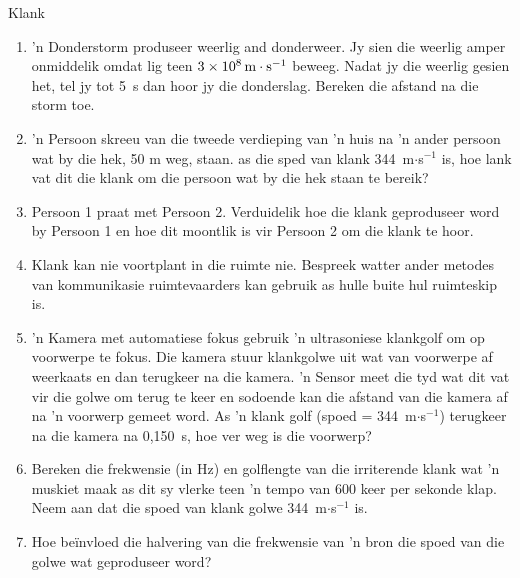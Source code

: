 \begin{eocexercises}{Klank}
\begin{enumerate}[noitemsep, label=\textbf{\arabic*}. ]
\item 'n Donderstorm produseer weerlig and donderweer. Jy sien die weerlig amper onmiddelik omdat lig teen $3\ensuremath{\times}{10}^{8}\phantom{\rule{0.166667em}{0ex}}\text{m}\ensuremath{\cdot}{\text{s}}^{-1}$ beweeg. Nadat jy die weerlig gesien het, tel jy tot 5~s dan hoor jy die donderslag. Bereken die afstand na die storm toe.

\item 'n Persoon skreeu van die tweede verdieping van 'n huis na 'n ander persoon wat by die hek, 50 m weg, staan. as die sped van klank 344~m$\ensuremath{\cdot}$s${}^{-1}$ is, hoe lank vat dit die klank om die persoon wat by die hek staan te bereik?



\item Persoon 1 praat met Persoon 2. Verduidelik hoe die klank geproduseer word by Persoon 1 en hoe dit moontlik is vir Persoon 2 om die klank te hoor.

\item Klank kan nie voortplant in die ruimte nie. Bespreek watter ander metodes van kommunikasie ruimtevaarders kan gebruik as hulle buite hul ruimteskip is.

\item 'n Kamera met automatiese fokus gebruik 'n ultrasoniese klankgolf om op voorwerpe te fokus. Die kamera stuur klankgolwe uit wat van voorwerpe af weerkaats en dan terugkeer na die kamera. 'n Sensor meet die tyd wat dit vat vir die golwe om terug te keer en sodoende kan die afstand van die kamera af na 'n voorwerp gemeet word. As 'n klank golf (spoed = 344~m$\ensuremath{\cdot}$s${}^{-1}$) terugkeer na die kamera na 0,150~s, hoe ver weg is die voorwerp?

\item Bereken die frekwensie (in Hz) en golflengte van die irriterende klank wat 'n muskiet maak as dit sy vlerke teen 'n tempo van 600 keer per sekonde klap. Neem aan dat die spoed van klank golwe 344~m$\ensuremath{\cdot}$s${}^{-1}$ is.

\item Hoe be\"invloed die halvering van die frekwensie van 'n bron die spoed van die golwe wat geproduseer word?


\end{enumerate}
\end{eocexercises}
